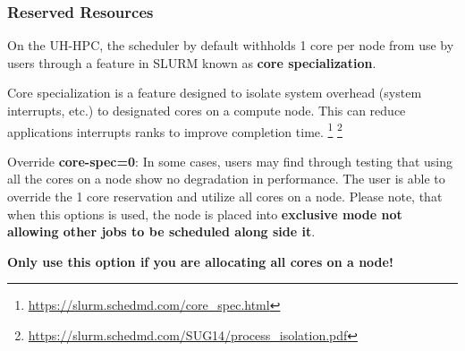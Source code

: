 \begin{frame}
\frametitle{Reserved Resources}

\begin{block}{}\footnotesize
On the UH-HPC, the scheduler by default withholds 1 core per node from use by users through a feature in SLURM known as \textbf{core specialization}.
\end{block}
\begin{definition}\footnotesize
Core specialization is a feature designed to isolate system overhead (system interrupts, etc.) to designated cores on a compute node. This can reduce applications interrupts ranks to improve completion time. \footnote[1,frame]{\tiny \href{https://slurm.schedmd.com/core_spec.html}{https://slurm.schedmd.com/core\_spec.html}} \footnote[2,frame]{\tiny \href{https://slurm.schedmd.com/SUG14/process_isolation.pdf}{https://slurm.schedmd.com/SUG14/process\_isolation.pdf}}
\end{definition}
\begin{block}{Override}\footnotesize
\textbf{{\ddash}core-spec=0}: In some cases, users may find through testing that using all the cores on a node show no degradation in performance.  The user is able to override the 1 core reservation and utilize all cores on a node.  Please note, that when this options is used, the node is placed into \textbf{exclusive mode not allowing other jobs to be scheduled along side it}.\\
\begin{center}\textbf{\normalsize{Only use this option if you are allocating all cores on a node!}}\end{center}
\end{block}
\end{frame}



